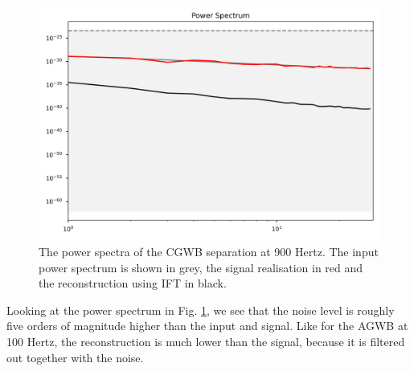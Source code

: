 \begin{figure}
    \centering
    \includegraphics[width=0.8\linewidth]{Images/power_spectrum_cosmo_900Hz_2D.png}
    \caption[The power spectra of the CGWB separation at 900 Hertz.]{The power spectra of the CGWB separation at 900 Hertz. The input power spectrum is shown in grey, the signal realisation in red and the reconstruction using IFT in black.}
    \label{cosmo_power_spectrum_nifty}
\end{figure} 

Looking at the power spectrum in Fig. \ref{cosmo_power_spectrum_nifty}, we see that the noise level is roughly five orders of magnitude higher than the input and signal. Like for the AGWB at 100 Hertz, the reconstruction is much lower than the signal, because it is filtered out together with the noise.